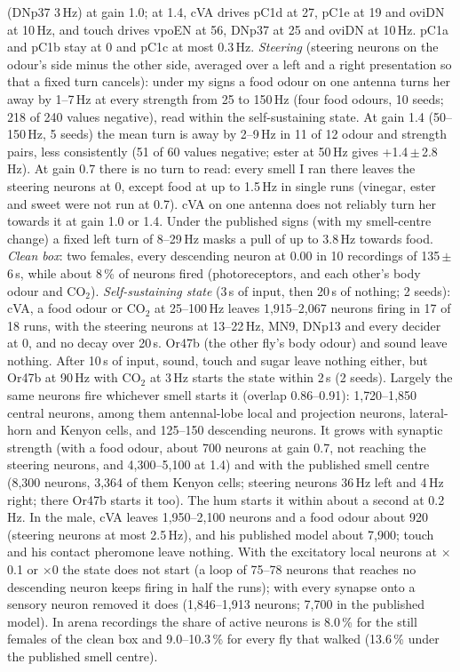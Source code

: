 \documentclass[11pt,a4paper]{article}
\begin{document}
\begin{enumerate}[leftmargin=*, label=\arabic*., itemsep=4pt]
(DNp37 3\,Hz) at gain 1.0; at 1.4, cVA drives pC1d at 27, pC1e at 19 and oviDN at 10\,Hz, and touch drives vpoEN at 56, DNp37 at 25 and oviDN at 10\,Hz. pC1a and pC1b stay at 0 and pC1c at most 0.3\,Hz.
\emph{Steering} (steering neurons on the odour's side minus the other side, averaged over a left and a right presentation so that a fixed turn cancels): under my signs a food odour on one antenna turns her away by 1--7\,Hz at every strength from 25 to 150\,Hz (four food odours, 10 seeds; 218 of 240 values negative), read within the self-sustaining state. At gain 1.4 (50--150\,Hz, 5 seeds) the mean turn is away by 2--9\,Hz in 11 of 12 odour and strength pairs, less consistently (51 of 60 values negative; ester at 50\,Hz gives +1.4\,$\pm$\,2.8\,Hz). At gain 0.7 there is no turn to read: every smell I ran there leaves the steering neurons at 0, except food at up to 1.5\,Hz in single runs (vinegar, ester and sweet were not run at 0.7). cVA on one antenna does not reliably turn her towards it at gain 1.0 or 1.4. Under the published signs (with my smell-centre change) a fixed left turn of 8--29\,Hz masks a pull of up to 3.8\,Hz towards food. \emph{Clean box}: two females, every descending neuron at 0.00 in 10 recordings of 135\,$\pm$\,6\,s, while about 8\,\% of neurons fired (photoreceptors, and each other's body odour and CO$_2$). \emph{Self-sustaining state} (3\,s of input, then 20\,s of nothing; 2 seeds): cVA, a food odour or CO$_2$ at 25--100\,Hz leaves 1{,}915--2{,}067 neurons firing in 17 of 18 runs, with the steering neurons at 13--22\,Hz, MN9, DNp13 and every decider at 0, and no decay over 20\,s. Or47b (the other fly's body odour) and sound leave nothing. After 10\,s of input, sound, touch and sugar leave nothing either, but Or47b at 90\,Hz with CO$_2$ at 3\,Hz starts the state within 2\,s (2 seeds). Largely the same neurons fire whichever smell starts it (overlap 0.86--0.91): 1{,}720--1{,}850 central neurons, among them antennal-lobe local and projection neurons, lateral-horn and Kenyon cells, and 125--150 descending neurons. It grows with synaptic strength (with a food odour, about 700 neurons at gain 0.7, not reaching the steering neurons, and 4{,}300--5{,}100 at 1.4) and with the published smell centre (8{,}300 neurons, 3{,}364 of them Kenyon cells; steering neurons 36\,Hz left and 4\,Hz right; there Or47b starts it too). The hum starts it within about a second at 0.2\,Hz. In the male, cVA leaves 1{,}950--2{,}100 neurons and a food odour about 920 (steering neurons at most 2.5\,Hz), and his published model about 7{,}900; touch and his contact pheromone leave nothing. With the excitatory local neurons at $\times$0.1 or $\times$0 the state does not start (a loop of 75--78 neurons that reaches no descending neuron keeps firing in half the runs); with every synapse onto a sensory neuron removed it does (1{,}846--1{,}913 neurons; 7{,}700 in the published model).
In arena recordings the share of active neurons is 8.0\,\% for the still females of the clean box and 9.0--10.3\,\% for every fly that walked (13.6\,\% under the published smell centre).


\end{enumerate}
\end{document}
